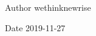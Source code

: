 \begin{DoxyAuthor}{Author}
wethinknewrise 
\end{DoxyAuthor}
\begin{DoxyDate}{Date}
2019-\/11-\/27 
\end{DoxyDate}
